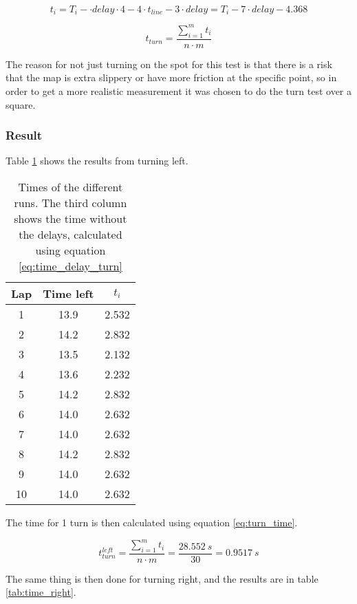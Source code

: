 \begin{equation} \label{eq:time_delay_turn}
t_i = T_i - \cdot delay\cdot 4 - 4\cdot t_{line} - 3 \cdot delay = T_i - 7 \cdot delay - 4.368
\end{equation}

\begin{equation} \label{eq:turn_time}
t_{turn} = \frac{\sum_{i=1}^m t_i}{n\cdot m}
\end{equation}

The reason for not just turning on the spot for this test is that there is a risk that the map is extra slippery or have more friction at the specific point, so in order to get a more realistic measurement it was chosen to do the turn test over a square. 

\subsubsection{Result}
Table \ref{tab:time_left} shows the results from turning left.
\begin{table} [H]
\centering
 \begin{tabular}{|c|c|c|}
  \hline Lap & Time left & $t_i$ \\ \hline
  1  & 13.9  & 2.532 \\  \hline
  2  & 14.2  & 2.832 \\  \hline
  3  & 13.5  & 2.132 \\  \hline
  4  & 13.6  & 2.232 \\  \hline
  5  & 14.2  & 2.832 \\  \hline
  6  & 14.0  & 2.632 \\  \hline
  7  & 14.0  & 2.632 \\  \hline
  8  & 14.2  & 2.832 \\  \hline
  9  & 14.0  & 2.632 \\  \hline
  10 & 14.0  & 2.632 \\ \hline
 \end{tabular}
 \caption{Times of the different runs. The third column shows the time without the delays, calculated using equation \ref{eq:time_delay_turn}}
 \label{tab:time_left}
\end{table}



The time for 1 turn is then calculated using equation \ref{eq:turn_time}.

$$
t_{turn}^{left} = \frac{\sum^{m}_{i=1}t_i}{n\cdot m} = \frac{28.552\ s}{30} = 0.9517\ s
$$

The same thing is then done for turning right, and the results are in table \ref{tab:time_right}.

